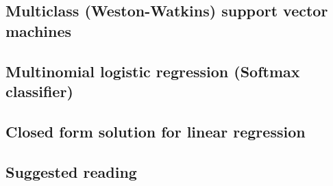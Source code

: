 \subsection{Multiclass (Weston-Watkins) support vector machines}

\subsection{Multinomial logistic regression (Softmax classifier)}

\subsection{Closed form solution for linear regression}


\subsection{Suggested reading}


